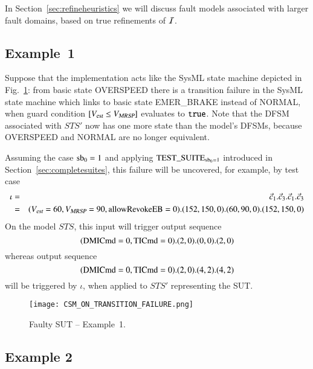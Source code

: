 In Section~\ref{sec:refineheuristics} we will discuss   fault models associated with 
larger fault domains, based on true refinements  of ${\cal I}$.




\subsection{Example~1}\label{sec:ex1}

Suppose that the implementation acts like the SysML state machine depicted in 
Fig.~\ref{fig:transfail}: from basic state {\sf OVERSPEED} there is a transition failure in the SysML state machine which links to basic state {\sf EMER\_BRAKE} instead of {\sf NORMAL}, when guard condition $[{V_{\text{\sl est}}}\le{V_{\text{\sl MRSP}}}]$ evaluates to $\mbox{{\tt true}}$. Note that the DFSM associated with $STS'$ now has one more state than the model's DFSMs, because {\sf OVERSPEED} and {\sf NORMAL} are no longer equivalent.

Assuming the case $\text{sb}_0=1$ and applying $\text{TEST\_SUITE}_{\text{sb}_0=1}$ introduced in Section~\ref{sec:completesuites}, this failure will be uncovered, for example, by test case
\footnotesize
\begin{eqnarray*}
\iota & = &\vec c_1. \vec c_3.\vec c_1.\vec c_3 
\\ & = & ({V_{\text{\sl est}}}=60,{V_{\text{\sl MRSP}}}=90,\text{allowRevokeEB}=0).(152,150,0).(60,90,0).(152,150,0)
\end{eqnarray*}
\normalsize
On the model $STS$, this input will trigger output sequence
$$
(\text{DMICmd}=0,\text{TICmd}=0).(2,0).(0,0).(2,0)
$$
whereas output sequence
$$
(\text{DMICmd}=0,\text{TICmd}=0).(2,0).(4,2).(4,2)
$$
will be triggered by $\iota$, when applied to $STS'$ representing the SUT. 
 
 \begin{figure}
 \hspace*{-20mm}
\texttt{[image: CSM\_ON\_TRANSITION\_FAILURE.png]}
\caption{Faulty SUT -- Example~1.}
 \label{fig:transfail}
 \end{figure}


\subsection{Example 2}\label{sec:example2}

